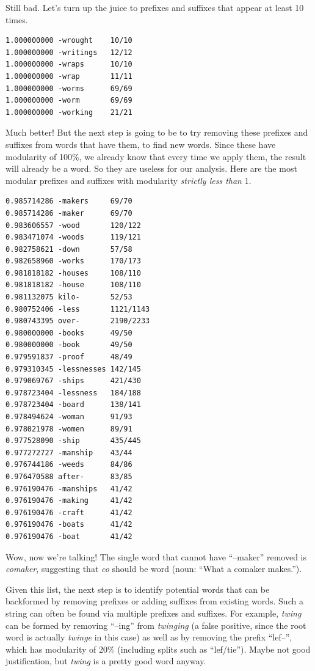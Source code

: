 \documentclass[twocolumn]{article}
\begin{document}
Still bad. Let's turn up the juice to prefixes and suffixes that
appear at least 10 times.

\begin{verbatim}
1.000000000 -wrought    10/10
1.000000000 -writings   12/12
1.000000000 -wraps      10/10
1.000000000 -wrap       11/11
1.000000000 -worms      69/69
1.000000000 -worm       69/69
1.000000000 -working    21/21
\end{verbatim}

Much better! But the next step is going to be to try removing these
prefixes and suffixes from words that have them, to find new words.
Since these have modularity of 100\%, we already know that every
time we apply them, the result will already be a word. So they are
useless for our analysis. Here are the most modular prefixes
and suffixes with modularity {\it strictly less than} 1.

\begin{verbatim}
0.985714286 -makers     69/70
0.985714286 -maker      69/70
0.983606557 -wood       120/122
0.983471074 -woods      119/121
0.982758621 -down       57/58
0.982658960 -works      170/173
0.981818182 -houses     108/110
0.981818182 -house      108/110
0.981132075 kilo-       52/53
0.980752406 -less       1121/1143
0.980743395 over-       2190/2233
0.980000000 -books      49/50
0.980000000 -book       49/50
0.979591837 -proof      48/49
0.979310345 -lessnesses 142/145
0.979069767 -ships      421/430
0.978723404 -lessness   184/188
0.978723404 -board      138/141
0.978494624 -woman      91/93
0.978021978 -women      89/91
0.977528090 -ship       435/445
0.977272727 -manship    43/44
0.976744186 -weeds      84/86
0.976470588 after-      83/85
0.976190476 -manships   41/42
0.976190476 -making     41/42
0.976190476 -craft      41/42
0.976190476 -boats      41/42
0.976190476 -boat       41/42
\end{verbatim}

Wow, now we're talking! The single word that cannot have ``--maker''
removed is {\it comaker}, suggesting that {\it co} should be word
(noun: ``What a comaker makes.'').

Given this list, the next step is to identify potential words that
can be backformed by removing prefixes or adding suffixes from existing
words. Such a string can often be found via multiple prefixes and
suffixes. For example, {\it twing} can be formed by removing ``--ing''
from {\it twinging} (a false positive, since the root word is actually
{\it twinge} in this case) as well as by removing the prefix ``lef--'',
which has modularity of 20\% (including splits such as ``lef/tie'').
Maybe not good justification, but {\it twing} is a pretty good word
anyway.
\end{document}
